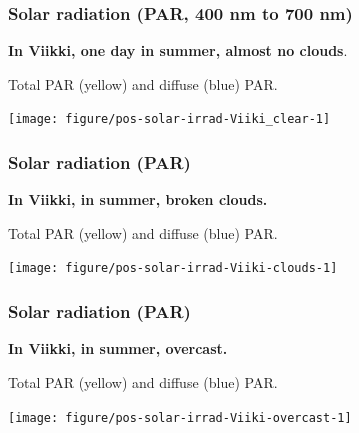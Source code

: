 \documentclass[10pt]{beamer}\usepackage[]{graphicx}\usepackage[]{color}
\newenvironment{knitrout}{}{} %
\begin{document}
\begin{frame}
  \frametitle{Solar radiation (PAR, 400 nm to 700 nm)}

  \textbf{In Viikki, one day in summer, almost no clouds}.
  
  Total PAR (yellow) and diffuse (blue) PAR.

\begin{knitrout}\tiny
{}\color{fgcolor}

{\centering \texttt{[image: figure/pos-solar-irrad-Viiki\_clear-1]} 

}


\end{knitrout}
\end{frame}

\begin{frame}
  \frametitle{Solar radiation (PAR)}

  \textbf{In Viikki, in summer, broken clouds.}

  Total PAR (yellow) and diffuse (blue) PAR.

\begin{knitrout}\tiny
{}\color{fgcolor}

{\centering \texttt{[image: figure/pos-solar-irrad-Viiki-clouds-1]} 

}


\end{knitrout}
\end{frame}

\begin{frame}
  \frametitle{Solar radiation (PAR)}

  \textbf{In Viikki, in summer, overcast.}

  Total PAR (yellow) and diffuse (blue) PAR.

\begin{knitrout}\tiny
{}\color{fgcolor}

{\centering \texttt{[image: figure/pos-solar-irrad-Viiki-overcast-1]} 

}


\end{knitrout}
\end{frame}
\end{document}
